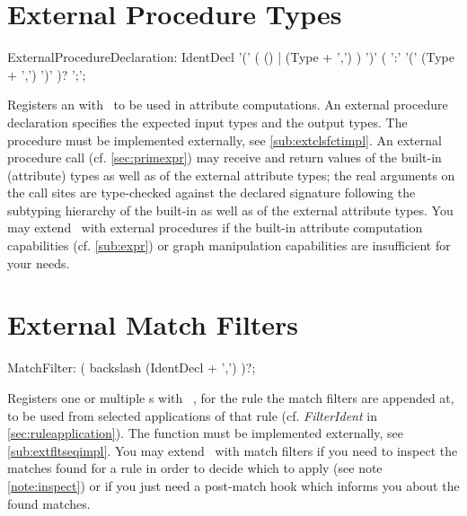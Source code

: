 \section{External Procedure Types}\label{sub:extproc}
\begin{rail}
  ExternalProcedureDeclaration: IdentDecl '(' ( () | (Type + ',') ) ')' ( ':' '(' (Type + ',') ')' )? ';';
\end{rail}
Registers an  with \GrG~to be used in attribute computations.
An external procedure declaration specifies the expected input types and the output types. The procedure must be implemented externally, see \ref{sub:extclsfctimpl}.
An external procedure call (cf. \ref{sec:primexpr}) may receive and return values of the built-in (attribute) types as well as of the external attribute types; the real arguments on the call sites are type-checked against the declared signature following the subtyping hierarchy of the built-in as well as of the external attribute types.
You may extend \GrG~with external procedures if the built-in attribute computation capabilities (cf. \ref{sub:expr}) or graph manipulation capabilities are insufficient for your needs.

\section{External Match Filters}\label{sub:extflt}

\begin{rail}
  MatchFilter: ( backslash (IdentDecl + ',') )?;
\end{rail}

Registers one or multiple s with \GrG~, for the rule the match filters are appended at, to be used from selected applications of that rule (cf. \emph{FilterIdent} in \ref{sec:ruleapplication}).
The  function must be implemented externally, see \ref{sub:extfltseqimpl}.
You may extend \GrG~with match filters if you need to inspect the matches found for a rule in order to decide which to apply (see note \ref{note:inspect}) or if you just need a post-match hook which informs you about the found matches.

